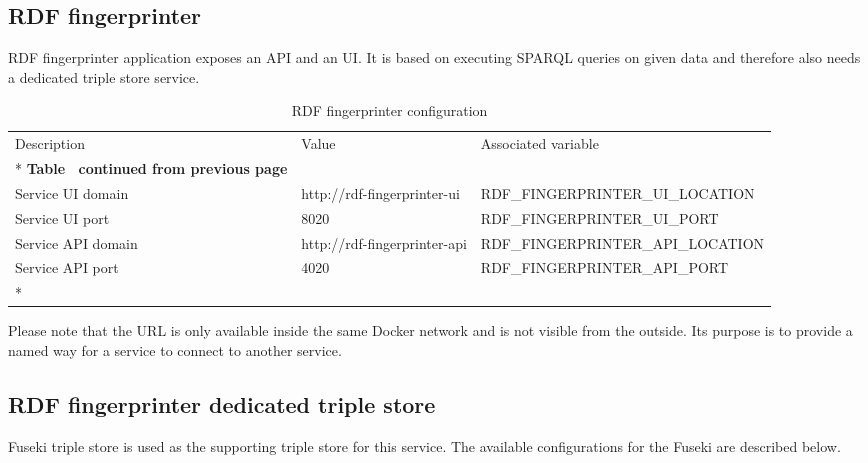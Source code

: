 	\subsection{RDF fingerprinter}
	
	RDF fingerprinter application exposes an API and an UI. It is based on executing SPARQL queries on given data and therefore also needs a dedicated triple store service. 

	\begin{longtable}[c]{@{}p{3.8cm}p{3cm}l@{}}
		\toprule
		Description & Value & Associated variable \\* \midrule
		\endfirsthead
		\multicolumn{3}{c}%
		{{\bfseries Table \thetable\ continued from previous page}} \\
		\endhead
		\bottomrule
		\endfoot
		\endlastfoot
		Service UI domain & http://rdf-fingerprinter-ui & RDF\_FINGERPRINTER\_UI\_LOCATION \\
		Service UI port & 8020 & RDF\_FINGERPRINTER\_UI\_PORT \\
		Service API domain & http://rdf-fingerprinter-api & RDF\_FINGERPRINTER\_API\_LOCATION \\
		Service API port & 4020 & RDF\_FINGERPRINTER\_API\_PORT \\* \bottomrule
		\caption{RDF fingerprinter configuration}
		\label{tab:my-table7}\\
	\end{longtable}

	Please note that the URL is only available inside the same Docker network and is not visible from the outside. Its purpose is to provide a named way for a service to connect to another service.
	
	\subsection{RDF fingerprinter dedicated triple store}
	
	Fuseki triple store is used as the supporting triple store for this service.
	The available configurations for the Fuseki are described below. 
	
